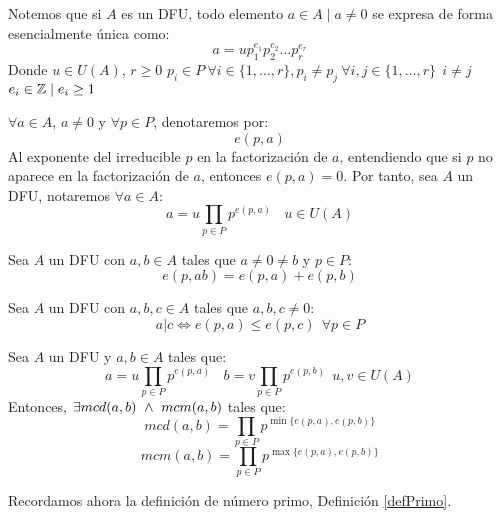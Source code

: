 Notemos que si $A$ es un DFU, todo elemento $a \in A \mid a\neq 0$ se expresa de forma esencialmente única como:
$$a=up_1^{e_1}p_2^{e_2}\ldots p_r^{e_r}$$
Donde $u \in U(A)$, $r\geq 0$\newline
$p_i \in P~\forall i \in \{1, \ldots, r\}, p_i\neq p_j~\forall i,j \in \{1, \ldots, r\}~~i \neq j$\newline
$e_i \in \mathbb Z \mid e_i \geq 1$

\begin{notacion}
$\forall a \in A$, $a \neq 0$ y $\forall p \in P$, denotaremos por:
$$e(p,a)$$
Al exponente del irreducible $p$ en la factorización de $a$, entendiendo que si $p$ no aparece en la factorización de $a$,
entonces $e(p,a)=0$. Por tanto, sea $A$ un DFU, notaremos $\forall a \in A$:
$$a = u \prod_{p \in P} p^{e(p,a)}~~~~u \in U(A)$$
\end{notacion}

\begin{lema}
    Sea $A$ un DFU con $a, b \in A$ tales que $a\neq 0\neq b$ y $p \in P$:
    $$e(p,ab) = e(p,a) + e(p,b)$$
\end{lema}

\begin{lema}
    Sea $A$ un DFU con $a, b, c \in A$ tales que $a, b, c \neq 0$:
    $$a|c \Leftrightarrow e(p,a) \leq e(p,c)~~\forall p \in P$$
\end{lema}

\begin{prop}
    \label{propExistenMCDDFU}
    Sea $A$ un DFU y $a, b \in A$ tales que:
    $$a=u\prod_{p \in P} p^{e(p,a)}~~~~b=v\prod_{p\in P} p^{e(p,b)}~~u,v \in U(A)$$
    Entonces, $\exists mcd(a,b) \ \land \  mcm(a,b)$ tales que:
    $$mcd(a,b) = \prod_{p \in P} p^{\min\{e(p,a),e(p,b)\}}$$
    $$mcm(a,b) = \prod_{p \in P} p^{\max\{e(p,a),e(p,b)\}}$$
\end{prop}

Recordamos ahora la definición de número primo, Definición \ref{defPrimo}.

